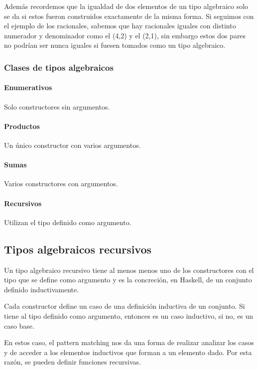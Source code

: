 Además recordemos que la igualdad de dos elementos de un tipo algebraico solo se da si estos fueron construidos exactamente de la misma forma. Si seguimos con el ejemplo de los racionales, sabemos que hay racionales iguales con distinto numerador y denominador como el (4,2) y el (2,1), sin embargo estos dos pares no podrían ser nunca iguales si fuesen tomados como un tipo algebraico.

\subsubsection{Clases de tipos algebraicos}

\paragraph{Enumerativos} Solo constructores sin argumentos.

\paragraph{Productos} Un único constructor con varios argumentos.

\paragraph{Sumas} Varios constructores con argumentos.

\paragraph{Recursivos} Utilizan el tipo definido como argumento.

\subsection{Tipos algebraicos recursivos}
Un tipo algebraico recursivo tiene al menos menos uno de los constructores con el tipo que se define como argumento y es la concreción, en Haskell, de un conjunto definido inductivamente.

Cada constructor define un caso de una definición inductiva de un conjunto. Si tiene al tipo definido como argumento, entonces es un caso inductivo, si no, es un caso base.

En estos caso, el pattern matching nos da una forma de realizar analizar los casos y de acceder a los elementos inductivos que forman a un elemento dado. Por esta razón, se pueden definir funciones recursivas.

